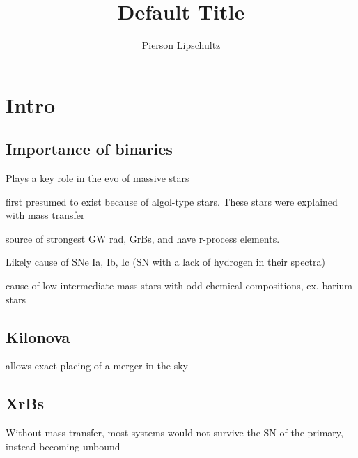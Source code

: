 \documentclass{article}
\title{Default Title}
\author{Pierson Lipschultz}
\begin{document}
\tableofcontents

\section{Intro}
\subsection{Importance of binaries}
\begin{list}{-}{}
\item Plays a key role in the evo of massive stars
\item first presumed to exist because of \gls{algol-type} stars. These stars were explained with mass transfer
\item source of strongest GW rad, GrBs, and have r-process elements.
\item Likely cause of SNe Ia, Ib, Ic (SN with a lack of hydrogen in their spectra) 
\item cause of low-intermediate mass stars with odd chemical compositions, ex. barium stars
\end{list}

\subsection{Kilonova}
\begin{list}{-}{}
\item allows exact placing of a merger in the sky
\end{list}

\subsection{XrBs}
\begin{list}{-}{}
\item Without mass transfer, most systems would not survive the SN of the primary, instead becoming unbound
\end{list}

\clearpage

\printglossaries
\end{document}
